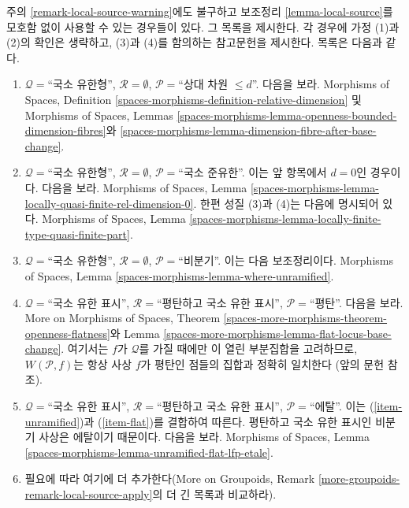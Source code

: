 \begin{remark}
\label{remark-local-source-apply}
주의 \ref{remark-local-source-warning}에도 불구하고
보조정리 \ref{lemma-local-source}를 모호함 없이 사용할 수 있는 경우들이 있다.
그 목록을 제시한다. 각 경우에 가정 (1)과 (2)의 확인은 생략하고,
(3)과 (4)를 함의하는 참고문헌을 제시한다. 목록은 다음과 같다.
\begin{enumerate}
\item
\label{item-rel-dim-leq-d}
$\mathcal{Q} = $``국소 유한형'', $\mathcal{R} = \emptyset$,
$\mathcal{P} =$``상대 차원 $\leq d$''.
다음을 보라.
Morphisms of Spaces,
Definition \ref{spaces-morphisms-definition-relative-dimension} 및
Morphisms of Spaces, Lemmas
\ref{spaces-morphisms-lemma-openness-bounded-dimension-fibres}와
\ref{spaces-morphisms-lemma-dimension-fibre-after-base-change}.
\item
\label{item-loc-quasi-finite}
$\mathcal{Q} =$``국소 유한형'', $\mathcal{R} = \emptyset$,
$\mathcal{P} =$``국소 준유한''.
이는 앞 항목에서 $d = 0$인 경우이다. 다음을 보라.
Morphisms of Spaces, Lemma
\ref{spaces-morphisms-lemma-locally-quasi-finite-rel-dimension-0}.
한편 성질 (3)과 (4)는 다음에 명시되어 있다.
Morphisms of Spaces, Lemma
\ref{spaces-morphisms-lemma-locally-finite-type-quasi-finite-part}.
\item
\label{item-unramified}
$\mathcal{Q} = $``국소 유한형'', $\mathcal{R} = \emptyset$,
$\mathcal{P} =$``비분기''. 이는 다음 보조정리이다.
Morphisms of Spaces, Lemma \ref{spaces-morphisms-lemma-where-unramified}.
\item
\label{item-flat}
$\mathcal{Q} =$``국소 유한 표시'',
$\mathcal{R} =$``평탄하고 국소 유한 표시'',
$\mathcal{P} =$``평탄''. 다음을 보라.
More on Morphisms of Spaces, Theorem
\ref{spaces-more-morphisms-theorem-openness-flatness}와
Lemma \ref{spaces-more-morphisms-lemma-flat-locus-base-change}.
여기서는 $f$가 $\mathcal{Q}$를 가질 때에만 이 열린 부분집합을 고려하므로,
$W(\mathcal{P}, f)$는 항상 사상 $f$가 평탄인 점들의 집합과 정확히 일치한다
(앞의 문헌 참조).
\item
\label{item-etale}
$\mathcal{Q} =$``국소 유한 표시'',
$\mathcal{R} =$``평탄하고 국소 유한 표시'',
$\mathcal{P}=$``에탈''. 이는 (\ref{item-unramified})과
(\ref{item-flat})를 결합하여 따른다. 평탄하고 국소 유한 표시인 비분기
사상은 에탈이기 때문이다. 다음을 보라.
Morphisms of Spaces,
Lemma \ref{spaces-morphisms-lemma-unramified-flat-lfp-etale}.
\item 필요에 따라 여기에 더 추가한다(More on Groupoids,
Remark \ref{more-groupoids-remark-local-source-apply}의 더 긴 목록과 비교하라).
\end{enumerate}
\end{remark}











